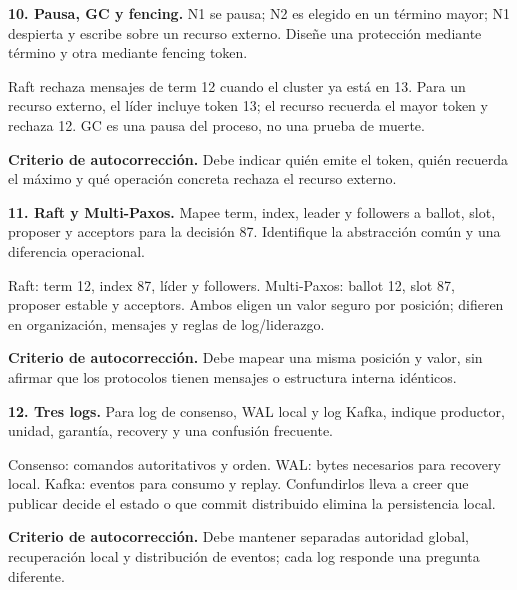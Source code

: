 \documentclass[variant=guiaresuelta,cover=institutional,mode=screen]{ua-engineering-v6-article}
\begin{document}
\begin{uaexercise}
\textbf{10. Pausa, GC y fencing.} N1 se pausa; N2 es elegido en un término mayor; N1 despierta y escribe sobre un recurso externo. Diseñe una protección mediante término y otra mediante fencing token.
\end{uaexercise}
\begin{uaanswer}
Raft rechaza mensajes de term 12 cuando el cluster ya está en 13. Para un recurso externo, el líder incluye token 13; el recurso recuerda el mayor token y rechaza 12. GC es una pausa del proceso, no una prueba de muerte.

\par\smallskip\textbf{Criterio de autocorrección.} Debe indicar quién emite el token, quién recuerda el máximo y qué operación concreta rechaza el recurso externo.
\end{uaanswer}

\begin{uaexercise}
\textbf{11. Raft y Multi-Paxos.} Mapee term, index, leader y followers a ballot, slot, proposer y acceptors para la decisión 87. Identifique la abstracción común y una diferencia operacional.
\end{uaexercise}
\begin{uaanswer}
Raft: term 12, index 87, líder y followers. Multi-Paxos: ballot 12, slot 87, proposer estable y acceptors. Ambos eligen un valor seguro por posición; difieren en organización, mensajes y reglas de log/liderazgo.

\par\smallskip\textbf{Criterio de autocorrección.} Debe mapear una misma posición y valor, sin afirmar que los protocolos tienen mensajes o estructura interna idénticos.
\end{uaanswer}

\begin{uaexercise}
\textbf{12. Tres logs.} Para log de consenso, WAL local y log Kafka, indique productor, unidad, garantía, recovery y una confusión frecuente.
\end{uaexercise}
\begin{uaanswer}
Consenso: comandos autoritativos y orden. WAL: bytes necesarios para recovery local. Kafka: eventos para consumo y replay. Confundirlos lleva a creer que publicar decide el estado o que commit distribuido elimina la persistencia local.

\par\smallskip\textbf{Criterio de autocorrección.} Debe mantener separadas autoridad global, recuperación local y distribución de eventos; cada log responde una pregunta diferente.
\end{uaanswer}
\end{document}
